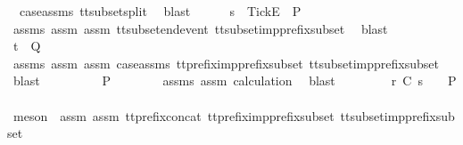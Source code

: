 \begin{isabellebody}
\ {\isachardoublequoteopen}{}{\isachardoublequoteclose}\ case{\isacharunderscore}assms{\isacharparenleft}{}{\isacharparenright}\ tt{\isacharunderscore}subset{\isacharunderscore}split\ \isamarkupfalse%
\ blast\isanewline
\ \ \ \ \isamarkupfalse%
\ {\isachardoublequoteopen}s{\isacharprime}\ {\isacharat}\ {\isacharbrackleft}{\isacharbrackleft}Tick{\isacharbrackright}\isactrlsub E{\isacharbrackright}\ {\isasymin}\ P{\isachardoublequoteclose}\isanewline
\ \ \ \ \ \ \isamarkupfalse%
\ {\isasymrho}{\isacharunderscore}assms\ assm{}\ assm{}\ tt{\isacharunderscore}subset{\isacharunderscore}end{\isacharunderscore}event\ tt{\isacharunderscore}subset{\isacharunderscore}imp{\isacharunderscore}prefix{\isacharunderscore}subset\ \isamarkupfalse%
\ blast\isanewline
\ \ \ \ \isamarkupfalse%
\ \isamarkupfalse%
\ {\isachardoublequoteopen}t{\isacharprime}{\isacharprime}\ {\isasymin}\ Q{\isachardoublequoteclose}\isanewline
\ \ \ \ \ \ \isamarkupfalse%
\ {\isasymrho}{\isacharunderscore}assms\ assm{}\ assm{}\ case{\isacharunderscore}assms{\isacharparenleft}{}{\isacharparenright}\ tt{\isacharunderscore}prefix{\isacharunderscore}imp{\isacharunderscore}prefix{\isacharunderscore}subset\ tt{\isacharunderscore}subset{\isacharunderscore}imp{\isacharunderscore}prefix{\isacharunderscore}subset\ \isamarkupfalse%
\ blast\isanewline
\ \ \ \ \isamarkupfalse%
\ \isamarkupfalse%
\ {\isachardoublequoteopen}{\isasymrho}\ {\isasymin}\ P{\isachardoublequoteclose}\isanewline
\ \ \ \ \ \ \isamarkupfalse%
\ {\isasymrho}{\isacharunderscore}assms\ assm{}\ calculation\ \isamarkupfalse%
\ blast\isanewline
\ \ \isamarkupfalse%
\isanewline
\ \ \ \ \isamarkupfalse%
\ {\isachardoublequoteopen}r\ {\isasymle}\isactrlsub C\ s\ {\isasymLongrightarrow}\ {\isasymrho}\ {\isasymin}\ P{\isachardoublequoteclose}\isanewline
\ \ \ \ \ \ \isamarkupfalse%
\ {\isacharparenleft}meson\ {\isachardoublequoteopen}{}{\isachardoublequoteclose}\ assm{}\ assm{}\ tt{\isacharunderscore}prefix{\isacharunderscore}concat\ tt{\isacharunderscore}prefix{\isacharunderscore}imp{\isacharunderscore}prefix{\isacharunderscore}subset\ tt{\isacharunderscore}subset{\isacharunderscore}imp{\isacharunderscore}prefix{\isacharunderscore}subset{\isacharparenright}\isanewline
\ \ \isamarkupfalse%

\end{isabellebody}
